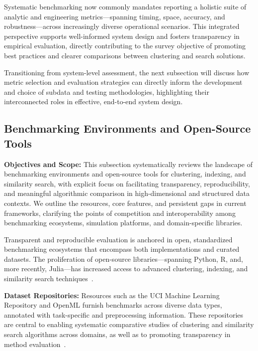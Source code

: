 \documentclass[sigconf]{acmart}
\begin{document}
Systematic benchmarking now commonly mandates reporting a holistic suite of analytic and engineering metrics—spanning timing, space, accuracy, and robustness—across increasingly diverse operational scenarios. This integrated perspective supports well-informed system design and fosters transparency in empirical evaluation, directly contributing to the survey objective of promoting best practices and clearer comparisons between clustering and search solutions.


Transitioning from system-level assessment, the next subsection will discuss how metric selection and evaluation strategies can directly inform the development and choice of subdata and testing methodologies, highlighting their interconnected roles in effective, end-to-end system design.

\subsection{Benchmarking Environments and Open-Source Tools}

\textbf{Objectives and Scope:} This subsection systematically reviews the landscape of benchmarking environments and open-source tools for clustering, indexing, and similarity search, with explicit focus on facilitating transparency, reproducibility, and meaningful algorithmic comparison in high-dimensional and structured data contexts. We outline the resources, core features, and persistent gaps in current frameworks, clarifying the points of competition and interoperability among benchmarking ecosystems, simulation platforms, and domain-specific libraries.

Transparent and reproducible evaluation is anchored in open, standardized benchmarking ecosystems that encompass both implementations and curated datasets. The proliferation of open-source libraries—spanning Python, R, and, more recently, Julia—has increased access to advanced clustering, indexing, and similarity search techniques~\cite{ref14, ref21, ref22, ref27, ref28, ref30, ref33, ref36, ref37, ref38, ref39, ref40, ref44, ref46, ref64, ref68, ref75, ref80, ref81, ref86, ref87, ref91, ref92, ref93, ref94, ref95, ref99, ref100, ref110}.

\textbf{Dataset Repositories:} Resources such as the UCI Machine Learning Repository and OpenML furnish benchmarks across diverse data types, annotated with task-specific and preprocessing information. These repositories are central to enabling systematic comparative studies of clustering and similarity search algorithms across domains, as well as to promoting transparency in method evaluation~\cite{ref14, ref80, ref81, ref87, ref92, ref93}.
\end{document}
